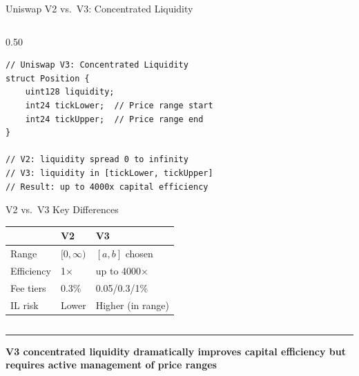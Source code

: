 \documentclass[8pt,aspectratio=169]{beamer}
\newcommand{\bottomnote}[1]{\vfill\vspace{-2mm}\textcolor{mllavender2}{\rule{\textwidth}{0.4pt}}\vspace{1mm}\footnotesize\textbf{#1}}
\begin{document}
\begin{frame}[fragile]{Uniswap V2 vs.\ V3: Concentrated Liquidity}
\begin{columns}[T]
\begin{column}{0.50\textwidth}
\begin{lstlisting}[language=Solidity, caption={}]
// Uniswap V3: Concentrated Liquidity
struct Position {
    uint128 liquidity;
    int24 tickLower;  // Price range start
    int24 tickUpper;  // Price range end
}

// V2: liquidity spread 0 to infinity
// V3: liquidity in [tickLower, tickUpper]
// Result: up to 4000x capital efficiency
\end{lstlisting}
      \vspace{3mm}
      \begin{block}{V2 vs.\ V3 Key Differences}
        \begin{tabular}{lll}
          \toprule
          & \textbf{V2} & \textbf{V3} \\
          \midrule
          Range     & $[0, \infty)$ & $[a, b]$ chosen \\
          Efficiency& 1$\times$     & up to 4000$\times$ \\
          Fee tiers & 0.3\%         & 0.05/0.3/1\%  \\
          IL risk   & Lower         & Higher (in range) \\
          \bottomrule
        \end{tabular}
      \end{block}
    \end{column}
  \end{columns}
  \bottomnote{V3 concentrated liquidity dramatically improves capital efficiency but requires active management of price ranges}
\end{frame}
\end{document}
